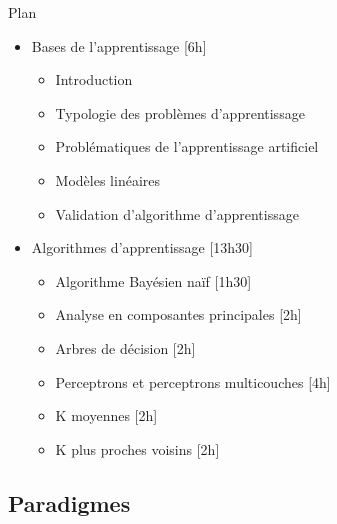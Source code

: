 \begin{frame}{Plan}
	\begin{itemize}
		\item Bases de l'apprentissage [6h]
		\begin{itemize}
			\item Introduction
			\item Typologie des problèmes d'apprentissage
			\item Problématiques de l'apprentissage artificiel
			\item Modèles linéaires
			\item Validation d'algorithme d'apprentissage
		\end{itemize}
		\item Algorithmes d'apprentissage [13h30]
		\begin{itemize}
			\item Algorithme Bayésien naïf [1h30]
			\item Analyse en composantes principales [2h]
			\item Arbres de décision [2h]
			\item Perceptrons et perceptrons multicouches [4h]
			\item K moyennes [2h]
			\item K plus proches voisins [2h]
		\end{itemize}
	\end{itemize}
\end{frame}

\subsection[Paradigmes]{Paradigmes}

